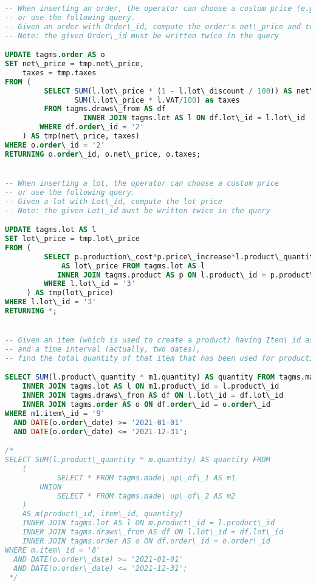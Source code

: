 \begin{lstlisting}[language=SQL,
keywordstyle=\color{blue},
stringstyle=\color{mauve},
showstringspaces=false,
basicstyle=\ttfamily\footnotesize]
-- When inserting an order, the operator can choose a custom price (e.g., decided with the customer)
-- or use the following query.
-- Given an order with Order\_id, compute the order's net\_price and total taxes.
-- Note: the given Order\_id must be written twice in the query

UPDATE tagms.order AS o
SET net\_price = tmp.net\_price,
    taxes = tmp.taxes
FROM (
         SELECT SUM(l.lot\_price * (1 - l.lot\_discount / 100)) AS net\_price,
                SUM(l.lot\_price * l.VAT/100) as taxes
         FROM tagms.draws\_from AS df
                  INNER JOIN tagms.lot AS l ON df.lot\_id = l.lot\_id
        WHERE df.order\_id = '2'
    ) AS tmp(net\_price, taxes)
WHERE o.order\_id = '2'
RETURNING o.order\_id, o.net\_price, o.taxes;


-- When inserting a lot, the operator can choose a custom price
-- or use the following query.
-- Given a lot with Lot\_id, compute the lot price
-- Note: the given Lot\_id must be written twice in the query

UPDATE tagms.lot AS l
SET lot\_price = tmp.lot\_price
FROM (
         SELECT p.production\_cost*p.price\_increase*l.product\_quantity
             AS lot\_price FROM tagms.lot AS l
            INNER JOIN tagms.product AS p ON l.product\_id = p.product\_id
         WHERE l.lot\_id = '3'
     ) AS tmp(lot\_price)
WHERE l.lot\_id = '3'
RETURNING *;


-- Given an item (which is used to create a product) having Item\_id as identifier
-- and a time interval (actually, two dates),
-- find the total quantity of that item that has been used for production or packaging during that time.

SELECT SUM(l.product\_quantity * m1.quantity) AS quantity FROM tagms.made\_up\_of\_1 AS m1
    INNER JOIN tagms.lot AS l ON m1.product\_id = l.product\_id
    INNER JOIN tagms.draws\_from AS df ON l.lot\_id = df.lot\_id
    INNER JOIN tagms.order AS o ON df.order\_id = o.order\_id
WHERE m1.item\_id = '9'
  AND DATE(o.order\_date) >= '2021-01-01'
  AND DATE(o.order\_date) <= '2021-12-31';

/*
SELECT SUM(l.product\_quantity * m.quantity) AS quantity FROM
    (
            SELECT * FROM tagms.made\_up\_of\_1 AS m1
        UNION
            SELECT * FROM tagms.made\_up\_of\_2 AS m2
    )
    AS m(product\_id, item\_id, quantity)
    INNER JOIN tagms.lot AS l ON m.product\_id = l.product\_id
    INNER JOIN tagms.draws\_from AS df ON l.lot\_id = df.lot\_id
    INNER JOIN tagms.order AS o ON df.order\_id = o.order\_id
WHERE m.item\_id = '8'
  AND DATE(o.order\_date) >= '2021-01-01'
  AND DATE(o.order\_date) <= '2021-12-31';
 */


\end{lstlisting}
